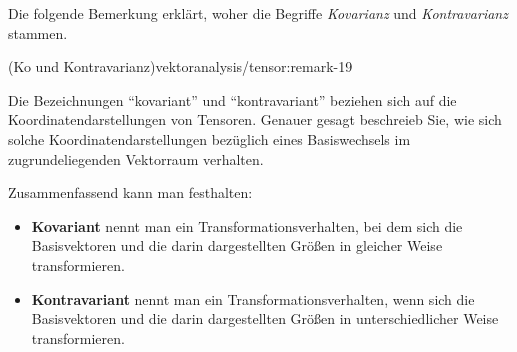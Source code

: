 \documentclass[letterpaper,10pt,english]{jupyterBook}
\begin{document}
\par
Die folgende Bemerkung erklärt, woher die Begriffe \emph{Kovarianz} und \emph{Kontravarianz} stammen.
\begin{remark}{(Ko  und Kontravarianz)}{vektoranalysis/tensor:remark-19}



\par
Die Bezeichnungen “kovariant” und “kontravariant” beziehen sich auf die Koordinatendarstellungen von Tensoren.
Genauer gesagt beschreieb Sie, wie sich solche Koordinatendarstellungen bezüglich eines Basiswechsels im zugrundeliegenden Vektorraum verhalten.

\par
Zusammenfassend kann man festhalten:
\begin{itemize}
\item {} 
\par
\textbf{Kovariant} nennt man ein Transformationsverhalten, bei dem sich die Basisvektoren und die darin dargestellten Größen in gleicher Weise transformieren.

\item {} 
\par
\textbf{Kontravariant} nennt man ein Transformationsverhalten, wenn sich die Basisvektoren und die darin dargestellten Größen in unterschiedlicher Weise transformieren.

\end{itemize}
\end{remark}
\end{document}
